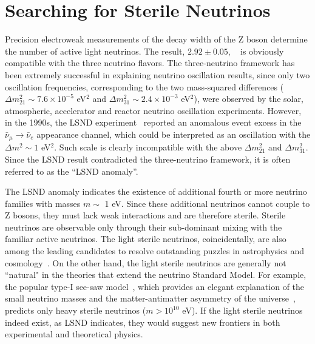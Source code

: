 \documentclass[aps,twocolumn,preprintnumbers,amsmath,superscriptaddress,amssymb,floats,nofootinbib]{revtex4-1}
\begin{document}
\section{Searching for Sterile Neutrinos}

Precision electroweak measurements of the decay width of the Z boson
determine the number of active light neutrinos. The result, $2.92 \pm 0.05$,  ~\cite{EW-2005} is obviously compatible with the three neutrino flavors.
The three-neutrino framework has been extremely successful in explaining neutrino oscillation results, since only two oscillation frequencies, corresponding to the two mass-squared differences 
($\Delta m_{21}^2\sim7.6\times10^{-5}$ eV$^2$ and $\Delta m_{31}^2 \sim2.4\times10^{-3}$ eV$^2$), 
were observed by the solar, atmospheric, accelerator and reactor neutrino oscillation experiments. 
However, in the 1990s, the LSND experiment~\cite{LSND1995,LSND2001} reported an anomalous 
event excess in the $\bar\nu_\mu\rightarrow\bar\nu_e$ appearance channel, which could be interpreted as an oscillation with the $\Delta m^2\sim1$ eV$^2$.
Such scale is clearly incompatible with the above $\Delta m_{21}^2$ and $\Delta m_{31}^2$.
Since the LSND result contradicted the three-neutrino framework, it is often referred to as the ``LSND anomaly''.

The LSND anomaly indicates the existence of additional fourth or more neutrino families with masses $m \sim$ 1 eV. 
Since these additional neutrinos cannot couple to Z bosons, they must lack weak interactions and are therefore sterile. 
Sterile neutrinos are observable only through their sub-dominant mixing with the familiar active neutrinos. 
The light sterile neutrinos, coincidentally, are also among the leading candidates to resolve outstanding puzzles in astrophysics and 
cosmology~\cite{Dodelson,Kusenko,Wyman,Battye}.
On the other hand, the light sterile neutrinos are generally not ``natural" in the theories that extend the neutrino Standard Model. 
For example, the popular type-I see-saw model~\cite{Minkowski,Yanagida,GellMann,Mohapatra}, 
which provides an elegant explanation of the small neutrino masses and the matter-antimatter asymmetry of the universe~\cite{Fukugita}, predicts only heavy sterile neutrinos ($m >10^{10}$ eV).
If the light sterile neutrinos indeed exist, as LSND indicates, they would suggest new frontiers in both experimental and theoretical physics.
\end{document}
